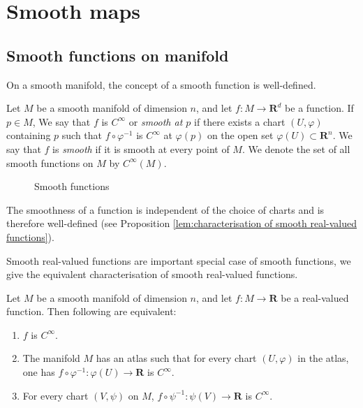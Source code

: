 \section{Smooth maps}

\subsection{Smooth functions on manifold}
On a smooth manifold, the concept of a smooth function is well-defined.
\begin{definition}
    Let $M$ be a smooth manifold of dimension $n$, and let $f : M \to \mathbf{R}^d$ be a function. If $p \in M$, We say that $f$ is $C^\infty$ or \emph{smooth at $p$} if there exists a chart $(U, \varphi)$ containing $p$ such that $f \circ \varphi^{-1}$ is $C^\infty$ at $\varphi(p)$ on the open set $\varphi(U) \subset \mathbf{R}^n$. We say that $f$ is \emph{smooth} if it is smooth at every point of $M$. We denote the set of all smooth functions on $M$ by $C^\infty(M)$.
\end{definition}

\begin{figure}[h]
    \centering
    
    \caption{Smooth functions}
\end{figure}

\begin{remark}
    The smoothness of a function is independent of the choice of charts and is therefore well-defined (see Proposition \ref{lem:characterisation of smooth real-valued functions}).
\end{remark}

Smooth real-valued functions are important special case of smooth functions, we give the equivalent characterisation of smooth real-valued functions.

\begin{proposition}\label{lem:characterisation of smooth real-valued functions}
    Let $M$ be a smooth manifold of dimension $n$, and let $f : M \to \mathbf{R}$ be a real-valued function. Then following are equivalent:
    \begin{enumerate}
        \item $f$ is $C^\infty$.
        \item The manifold $M$ has an atlas such that for every chart $(U, \varphi)$ in the atlas, one has $f \circ \varphi^{-1} : \varphi(U) \to \mathbf{R}$ is $C^\infty$.
        \item For every chart $(V, \psi)$ on $M$, $f \circ \psi^{-1} : \psi(V) \to \mathbf{R}$ is $C^\infty$.
    \end{enumerate}
\end{proposition}

